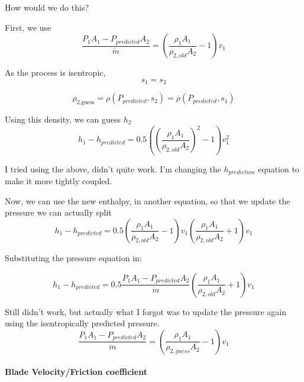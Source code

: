\documentclass[masters]{ucbthesis}
\renewcommand{\_}{\kern-1.5pt\textunderscore\kern-1.5pt}
\begin{document}
How would we do this?

First, we use 
\begin{equation*}
	\frac{P_1 A_1 - P_{predicted} A_2}{\dot{m}} =  \left( 
		\frac{\rho_1 A_1 }{\rho_{2,old}  A_2} - 1
	\right)
	v_1
\end{equation*}

As the process is isentropic,
\begin{equation*}
	s_1 = s_2
\end{equation*}

\begin{equation*}
	\rho_\text{2,guess} = \rho(P_{predicted},s_2) = \rho(P_{predicted},s_1)
\end{equation*}

Using this density, we can guess $h_{2}$
\begin{equation*}
	h_1 - h_{predicted} = 
	0.5 \left( \left(
			\frac{\rho_1 A_1 }{\rho_{2,old} A_2 } 
		\right)^2
	- 1 \right) v_1^2 
\end{equation*}

I tried using the above, didn't quite work. I'm changing the 
$h_{prediction}$ equation to make it more tightly coupled.

Now, we can use the new enthalpy, in another equation, so that we update 
the pressure
we can actually split
\begin{equation*}
	h_1 - h_{predicted} = 
	0.5 
	\left( 
		\frac{\rho_1 A_1 }{\rho_{2,old} A_2 } 
	- 1 \right) 
	v_1
	\left( 
		\frac{\rho_1 A_1 }{\rho_{2,old} A_2 } 
	+ 1 \right) 
	v_1 
\end{equation*}

Substituting the pressure equation in:


\begin{equation*}
	h_1 - h_{predicted} = 
	0.5 
	\frac{P_1 A_1 - P_{predicted} A_2}{\dot{m}}
	\left( 
		\frac{\rho_1 A_1 }{\rho_{2,old} A_2 } 
	+ 1 \right) 
	v_1 
\end{equation*}

Still didn't work, but actually what I forgot was to update the pressure 
again using the isentropically predicted pressure.
\begin{equation*}
	\frac{P_1 A_1 - P_{predicted} A_2}{\dot{m}} =  \left( 
		\frac{\rho_1 A_1 }{\rho_{2,guess}  A_2} - 1
	\right)
	v_1
\end{equation*}

\paragraph{Blade Velocity/Friction coefficient}
\end{document}
